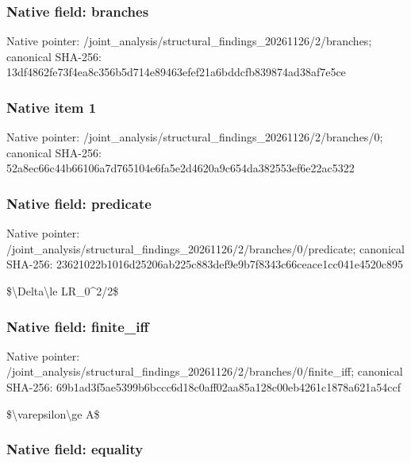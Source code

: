 \documentclass[10pt,a4paper]{article}
\begin{document}
\subsubsection{Native field: branches}


Native pointer: /joint\_analysis/structur\allowbreak{}al\_findings\_20261126/2/b\allowbreak{}ranches; canonical SHA-256: 13df4862fe73f4ea8c356b5d\allowbreak{}714e89463efef21a6bddcfb8\allowbreak{}39874ad38af7e5ce



\subsubsection{Native item 1}


Native pointer: /joint\_analysis/structur\allowbreak{}al\_findings\_20261126/2/b\allowbreak{}ranches/0; canonical SHA-256: 52a8ec66c44b66106a7d7651\allowbreak{}04e6fa5e2d4620a9c654da38\allowbreak{}2553ef6e22ac5322



\subsubsection{Native field: predicate}


Native pointer: /joint\_analysis/structur\allowbreak{}al\_findings\_20261126/2/b\allowbreak{}ranches/0/predicate; canonical SHA-256: 23621022b1016d25206ab225\allowbreak{}c883def9e9b7f8343c66ceac\allowbreak{}e1cc041e4520c895


\$\textbackslash{}Delta\textbackslash{}le LR\_0\textasciicircum{}2/2\$


\subsubsection{Native field: finite\_iff}


Native pointer: /joint\_analysis/structur\allowbreak{}al\_findings\_20261126/2/b\allowbreak{}ranches/0/finite\_iff; canonical SHA-256: 69b1ad3f5ae5399b6bccc6d1\allowbreak{}8c0aff02aa85a128c00eb426\allowbreak{}1c1878a621a54ccf


\$\textbackslash{}varepsilon\textbackslash{}ge A\$


\subsubsection{Native field: equality}
\end{document}
